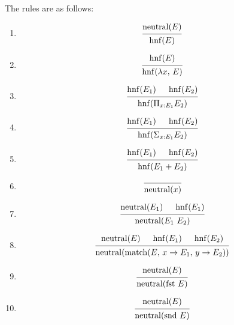 \documentclass{article}
\begin{document}
The rules are as follows:
\begin{enumerate}
  \item \[
    \begin{prooftree}
      \hypo{\neutral(E)}
      \infer1{\hnf(E)}
    \end{prooftree}
  \]

  \item \[
    \begin{prooftree}
      \hypo{\hnf(E)}
      \infer1{\hnf(\lambda x, \, E)}
    \end{prooftree}
  \]

  \item \[
    \begin{prooftree}
      \hypo{\hnf(E_1)}
      \hypo{\hnf(E_2)}
      \infer2{\hnf(\Pi_{x : E_1} E_2)}
    \end{prooftree}
  \]

 \item \[
    \begin{prooftree}
      \hypo{\hnf(E_1)}
      \hypo{\hnf(E_2)}
      \infer2{\hnf(\Sigma_{x : E_1} E_2)}
    \end{prooftree}
  \]

 \item \[
    \begin{prooftree}
      \hypo{\hnf(E_1)}
      \hypo{\hnf(E_2)}
      \infer2{\hnf(E_1 + E_2)}
    \end{prooftree}
  \]

  \item \[
    \begin{prooftree}
      \infer0{\neutral(x)}
    \end{prooftree}
  \]

  \item \[
    \begin{prooftree}
      \hypo{\neutral(E_1)} 
      \hypo{\hnf(E_1)} 
      \infer2{\neutral(E_1 \,\, E_2)}
    \end{prooftree}
  \]

  \item \[
    \begin{prooftree}
      \hypo{\neutral(E)} 
      \hypo{\hnf(E_1)} 
      \hypo{\hnf(E_2)} 
      \infer3{\neutral(\match(E, \, x \rightarrow E_1, \, y \rightarrow E_2))}
    \end{prooftree}
  \]

  \item \[
    \begin{prooftree}
      \hypo{\neutral(E)} 
      \infer1{\neutral(\fst \, E)}
    \end{prooftree}
  \]

  \item \[
    \begin{prooftree}
      \hypo{\neutral(E)} 
      \infer1{\neutral(\snd \, E)}
    \end{prooftree}
  \]
\end{enumerate}
\end{document}
